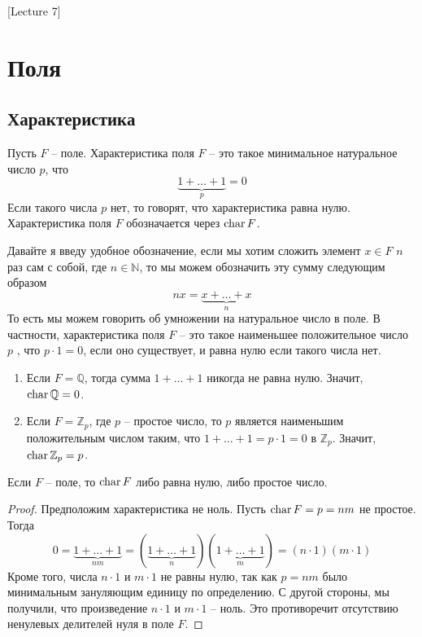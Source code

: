 [Lecture 7]


\section{Поля}

\subsection{Характеристика}

\begin{definition}
Пусть $F$ -- поле.
Характеристика поля $F$ -- это такое минимальное натуральное число $p$, что
\[
\underbrace{1+\ldots + 1}_p = 0
\]
Если такого числа $p$ нет, то говорят, что характеристика равна нулю.
Характеристика поля $F$ обозначается через $\operatorname{char} F$.
\end{definition}

Давайте я введу удобное обозначение, если мы хотим сложить элемент $x\in F$ $n$ раз сам с собой, где $n\in \mathbb N$, то мы можем обозначить эту сумму следующим образом
\[
n x = \underbrace{x+\ldots + x}_n
\]
То есть мы можем говорить об умножении на натуральное число в поле.
В частности, характеристика поля $F$ -- это такое наименьшее положительное число $p$ , что $p \cdot 1 = 0$, если оно существует, и равна нулю если такого числа нет.

\begin{examples}
\begin{enumerate}
\item Если $F = \mathbb Q$, тогда сумма $1+\ldots + 1$ никогда не равна нулю.
Значит, $\operatorname{char} \mathbb Q = 0$.

\item Если $F = \mathbb Z_p$, где $p$ -- простое число, то $p$ является наименьшим положительным числом таким, что $1 + \ldots + 1 = p \cdot 1 = 0$ в $\mathbb Z_p$.
Значит, $\operatorname{char} \mathbb Z_p = p$.
\end{enumerate}
\end{examples}

\begin{claim}
Если $F$ -- поле, то $\operatorname{char} F$ либо равна нулю, либо простое число.
\end{claim}
\begin{proof}
Предположим характеристика не ноль.
Пусть $\operatorname{char} F = p = n m$ не простое.
Тогда
\[
0 = \underbrace{1+\ldots + 1}_{nm} = (\underbrace{1+\ldots + 1}_{n})(\underbrace{1+\ldots + 1}_{m}) = (n \cdot 1) (m \cdot 1)
\]
Кроме того, числа $n\cdot 1$ и $m\cdot 1$ не равны нулю, так как $p = nm$ было минимальным зануляющим единицу по определению.
С другой стороны, мы получили, что произведение $n\cdot 1$ и $m \cdot 1$ -- ноль.
Это противоречит отсутствию ненулевых делителей нуля в поле $F$.
\end{proof}

